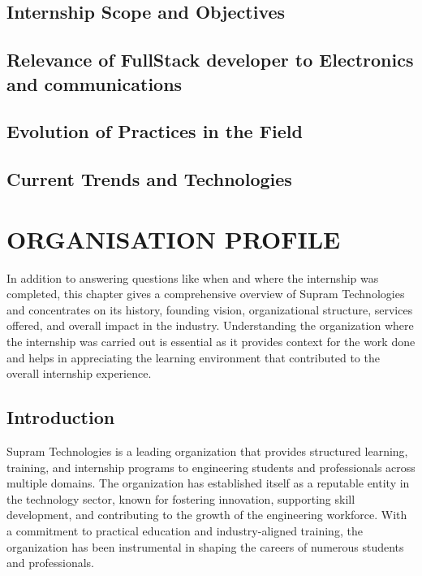 \documentclass[12pt,a4paper]{report}
\begin{document}
\section{Internship Scope and Objectives}


\section{Relevance of FullStack developer to Electronics and communications}


\section{Evolution of Practices in the Field}


\section{Current Trends and Technologies}




\chapter{ORGANISATION PROFILE}
\label{ch:org}


In addition to answering questions like when and where the internship was completed, this chapter gives a comprehensive overview of Supram Technologies and concentrates on its history, founding vision, organizational structure, services offered, and overall impact in the industry. Understanding the organization where the internship was carried out is essential as it provides context for the work done and helps in appreciating the learning environment that contributed to the overall internship experience.


\section{Introduction}

Supram Technologies is a leading organization that provides structured learning, training, and internship programs to engineering students and professionals across multiple domains. The organization has established itself as a reputable entity in the technology sector, known for fostering innovation, supporting skill development, and contributing to the growth of the engineering workforce. With a commitment to practical education and industry-aligned training, the organization has been instrumental in shaping the careers of numerous students and professionals.
\end{document}
